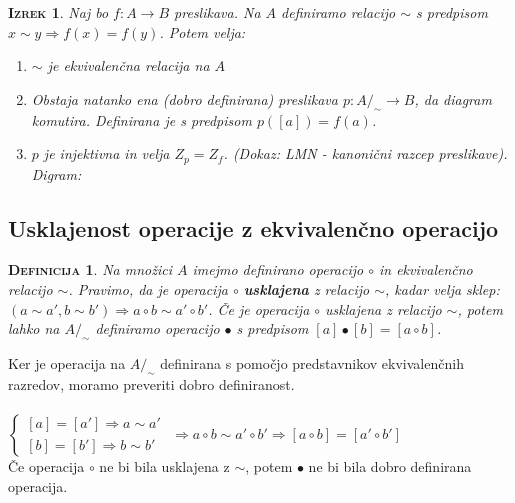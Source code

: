 \documentclass[a4paper,12pt]{article}
\newtheorem*{izrek}{\textsc{Izrek}}
\newtheorem*{definicija}{\textsc{Definicija}}
\begin{document}
\begin{izrek}
Naj bo $f:A\to B$ preslikava. Na $A$ definiramo relacijo $\sim$ s predpisom $x\sim y \Rightarrow f(x)=f(y)$. Potem velja:
\begin{enumerate}
\item[(1)] $\sim$ je ekvivalenčna relacija na $A$
\item[(2)] Obstaja natanko ena (dobro definirana) preslikava $p:A/_\sim \to B$, da diagram \Smiley{} komutira. Definirana je s predpisom $p([a])=f(a)$. 
\item[(3)] $p$ je injektivna in velja $Z_p=Z_f$. (Dokaz: LMN - kanonični razcep preslikave). Digram: \Smiley{} 
\end{enumerate}
\end{izrek}

\subsection{Usklajenost operacije z ekvivalenčno operacijo}

\begin{definicija}
Na množici $A$ imejmo definirano operacijo $\circ$ in ekvivalenčno relacijo $\sim$. \linebreak Pravimo, da je operacija $\circ$ \textbf{usklajena} z relacijo $\sim$, kadar velja sklep: $(a\sim a',b\sim b')\Rightarrow a\circ b \sim a'\circ b'$. Če je operacija $\circ$ usklajena z relacijo $\sim$, potem lahko na $A/_\sim$ definiramo operacijo $\bullet$ s predpisom $[a]\bullet[b]=[a\circ b]$.\\
\end{definicija}

Ker je operacija na $A/_\sim$ definirana s pomočjo predstavnikov ekvivalenčnih razredov, moramo preveriti dobro definiranost. \\

\dashuline{$[a]=[a'],[b]=[b']\Leftrightarrow [a\circ b]=[a'\circ b']$} \\

$
\begin{cases}
[a]=[a']\Rightarrow a\sim a' \\
[b]=[b']\Rightarrow b\sim b'
\end{cases} $
$ \Rightarrow a\circ b \sim a' \circ b'  \Rightarrow [a\circ b]=[a'\circ b']$ \\

Če operacija $\circ$ ne bi bila usklajena z $\sim$, potem $\bullet$ ne bi bila dobro definirana operacija.\\
\end{document}
